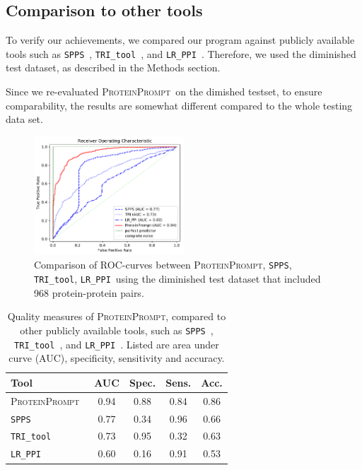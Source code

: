 \documentclass[3p,times,twocolumn]{elsarticle}
\newcommand{\spps}{\texttt{SPPS}}
\newcommand{\tri}{\texttt{TRI\_tool}}
\newcommand{\lr}{\texttt{LR\_PPI}}
\newcommand{\tool}{\textsc{ProteinPrompt}}
\begin{document}
\subsection{Comparison to other tools}

To verify our achievements, we compared our program against publicly
available tools such as \spps\ \cite{Liu:2012}, \tri\
\cite{Perovic:2017}, and \lr\ \cite{Pan:2010}. Therefore, we used the
diminished test dataset, as described in the Methods section. 

Since we re-evaluated \tool\  on the dimished testset, to ensure
comparability, the results are somewhat different compared to the
whole testing data set. 

\begin{figure}
  \includegraphics[width=0.5\textwidth]{img/comparison_roc.pdf}
  \caption{Comparison of ROC-curves between \tool, \spps, \tri, \lr\ 
    using the diminished test dataset that included 968
    protein-protein pairs.}
  \label{fig:comparison}
\end{figure}


\begin{table}
\begin{tabular}{|l |c | c | c | c |}
  \hline
  Tool  & AUC & Spec. & Sens. & Acc. \\
  \hline
  \tool\   & 0.94 & 0.88 & 0.84 &  0.86 \\
  \hline
  \spps\  & 0.77 & 0.34 & 0.96 & 0.66 \\
  \hline
  \tri\  & 0.73 & 0.95 & 0.32 & 0.63 \\
  \hline
  \lr\  & 0.60 & 0.16 & 0.91 & 0.53  \\
  \hline
\end{tabular}
\caption{ Quality measures of \tool, compared to other publicly
  available tools, such as \spps\ \cite{Liu:2012}, \tri\
  \cite{Perovic:2017}, and \lr\ \cite{Pan:2010}.
  Listed are area under curve (AUC), specificity, sensitivity and accuracy.}

\label{table:comparison}
\end{table}
\end{document}
